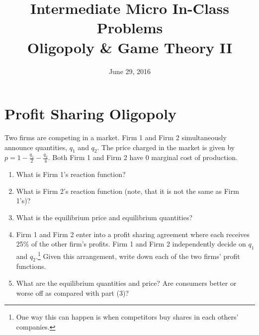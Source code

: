 \documentclass{article}
\begin{document}
\title{Intermediate Micro In-Class Problems \\ \large Oligopoly \& Game Theory II}

\date{June 29, 2016}

\maketitle

\section*{Profit Sharing Oligopoly}
Two firms are competing in a market. Firm 1 and Firm 2 simultaneously announce quantities, $q_{1}$ and $q_{2}$. The price charged in the market is given by $p = 1- \frac{q_{1}}{2} - \frac{q_{2}}{4}$. Both Firm 1 and Firm 2 have 0 marginal cost of production.

\begin{enumerate}
\item What is Firm 1's reaction function?
\item What is Firm 2's reaction function (note, that it is not the same as Firm 1's)?
\item What is the equilibrium price and equilibrium quantities?
\item Firm 1 and Firm 2 enter into a profit sharing agreement where each receives 25\% of the other firm's profits. Firm 1 and Firm 2 independently decide on $q_1$ and $q_2$.\footnote{One way this can happen is when competitors buy shares in each others' companies.} Given this arrangement, write down each of the two firms' profit functions.
\item What are the equilibrium quantities and price? Are consumers better or worse off as compared with part (3)?
\end{enumerate}
\end{document}
